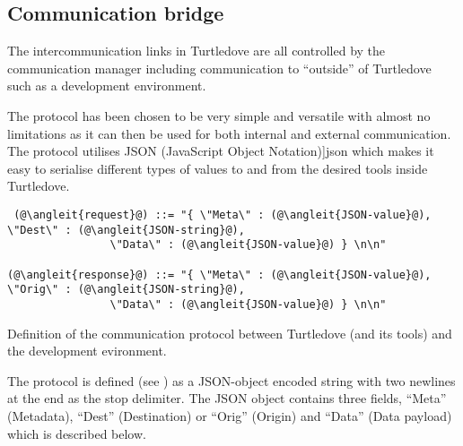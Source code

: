 \subsection{Communication bridge}

The intercommunication links in Turtledove are all controlled by the
communication manager including communication to ``outside'' of Turtledove such
as a development environment. 

\def \protocoljson {\Fref[plain]{fig:protocol-json}}

The protocol has been chosen to be very simple and versatile with almost no
limitations as it can then be used for both internal and external
communication. The protocol utilises JSON (JavaScript Object
Notation)\cite[\protocoljson]{json} which makes it easy to serialise different types of values
to and from the desired tools inside Turtledove.


\begin{nonfloatingfigure}
{ %
  \newcommand{\angleit}[1]{$\langle$\textnormal{\textit{#1}}$\rangle$}
\begin{lstlisting}
 (@\angleit{request}@) ::= "{ \"Meta\" : (@\angleit{JSON-value}@), \"Dest\" : (@\angleit{JSON-string}@),
                \"Data\" : (@\angleit{JSON-value}@) } \n\n"

(@\angleit{response}@) ::= "{ \"Meta\" : (@\angleit{JSON-value}@), \"Orig\" : (@\angleit{JSON-string}@),
                \"Data\" : (@\angleit{JSON-value}@) } \n\n"
\end{lstlisting}    
}
  
  \caption{Definition of the communication protocol between Turtledove (and its
    tools) and the development evironment.}
  \label{fig:intercom-protocol-def}
\end{nonfloatingfigure}


The protocol is defined (see ) as a JSON-object
encoded string with two newlines at the end as the stop delimiter. The JSON
object contains three fields, ``Meta'' (Metadata), ``Dest'' (Destination) or
``Orig'' (Origin) and ``Data'' (Data payload) which is described below.

